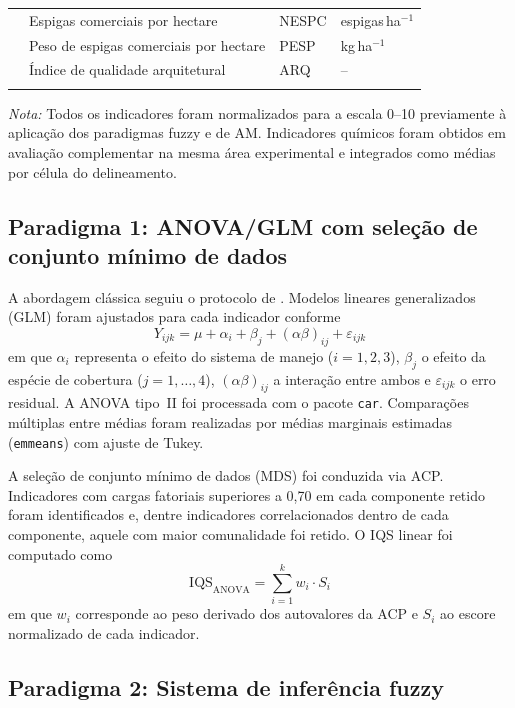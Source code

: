 \documentclass[pdflatex,sn-basic]{sn-jnl}%
\begin{document}
\begin{table}[h]
\begin{tabular*}{\textwidth}{@{\extracolsep\fill}llll}
  & Espigas comerciais por hectare & NESPC & espigas\,ha$^{-1}$ \\
  & Peso de espigas comerciais por hectare & PESP & kg\,ha$^{-1}$ \\
  & Índice de qualidade arquitetural & ARQ & -- \\
\botrule
\end{tabular*}
\smallskip\noindent\textit{Nota:} Todos os indicadores foram normalizados para a escala 0--10 previamente à aplicação dos paradigmas fuzzy e de AM. Indicadores químicos foram obtidos em avaliação complementar na mesma área experimental e integrados como médias por célula do delineamento.
\end{table}

\subsection{Paradigma 1: ANOVA/GLM com seleção de conjunto mínimo de dados}\label{subsec:anova}

A abordagem clássica seguiu o protocolo de \cite{Andrews2002}. Modelos lineares generalizados (GLM) foram ajustados para cada indicador conforme
\begin{equation}
Y_{ijk} = \mu + \alpha_i + \beta_j + (\alpha\beta)_{ij} + \varepsilon_{ijk}
\label{eq:glm}
\end{equation}
em que $\alpha_i$ representa o efeito do sistema de manejo ($i = 1, 2, 3$), $\beta_j$ o efeito da espécie de cobertura ($j = 1, \ldots, 4$), $(\alpha\beta)_{ij}$ a interação entre ambos e $\varepsilon_{ijk}$ o erro residual. A ANOVA tipo~II foi processada com o pacote \texttt{car}. Comparações múltiplas entre médias foram realizadas por médias marginais estimadas (\texttt{emmeans}) com ajuste de Tukey.

A seleção de conjunto mínimo de dados (MDS) foi conduzida via ACP. Indicadores com cargas fatoriais superiores a 0,70 em cada componente retido foram identificados e, dentre indicadores correlacionados dentro de cada componente, aquele com maior comunalidade foi retido. O IQS linear foi computado como
\begin{equation}
\text{IQS}_{\text{ANOVA}} = \sum_{i=1}^{k} w_i \cdot S_i
\label{eq:sqi_anova}
\end{equation}
em que $w_i$ corresponde ao peso derivado dos autovalores da ACP e $S_i$ ao escore normalizado de cada indicador.

\subsection{Paradigma 2: Sistema de inferência fuzzy}\label{subsec:fuzzy}
\end{document}
